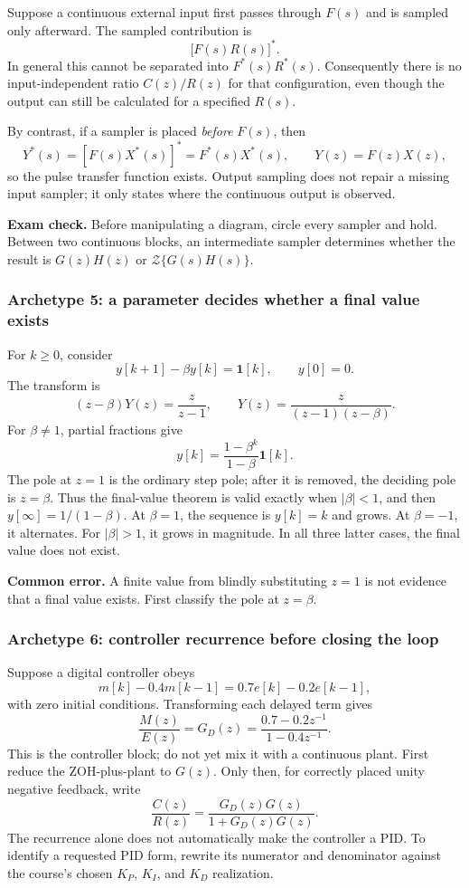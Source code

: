 \documentclass[11pt]{article}
\newcommand{\Z}{\mathcal{Z}}
\newcommand{\unitstep}{\mathbf{1}}
\newcommand{\commonerror}[1]{\par\smallskip\noindent\colorbox{red!8}{\parbox{\dimexpr\linewidth-2\fboxsep\relax}{\textbf{Common error.} #1}}\par\smallskip}
\newcommand{\examcheck}[1]{\par\smallskip\noindent\colorbox{blue!7}{\parbox{\dimexpr\linewidth-2\fboxsep\relax}{\textbf{Exam check.} #1}}\par\smallskip}
\begin{document}
Suppose a continuous external input first passes through $F(s)$ and is sampled only afterward.  The sampled contribution is
\[
\bigl[F(s)R(s)\bigr]^*.
\]
In general this cannot be separated into $F^*(s)R^*(s)$.  Consequently there is no input-independent ratio $C(z)/R(z)$ for that configuration, even though the output can still be calculated for a specified $R(s)$.

By contrast, if a sampler is placed \emph{before} $F(s)$, then
\[
Y^*(s)=[F(s)X^*(s)]^*=F^*(s)X^*(s),
\qquad Y(z)=F(z)X(z),
\]
so the pulse transfer function exists.  Output sampling does not repair a missing input sampler; it only states where the continuous output is observed.

\examcheck{Before manipulating a diagram, circle every sampler and hold.  Between two continuous blocks, an intermediate sampler determines whether the result is $G(z)H(z)$ or $\Z\{G(s)H(s)\}$.}

\subsubsection*{Archetype 5: a parameter decides whether a final value exists}

For $k\geq0$, consider
\[
y[k+1]-\beta y[k]=\unitstep[k],\qquad y[0]=0.
\]
The transform is
\[
(z-\beta)Y(z)=\frac{z}{z-1},
\qquad
Y(z)=\frac{z}{(z-1)(z-\beta)}.
\]
For $\beta\ne1$, partial fractions give
\[
y[k]=\frac{1-\beta^k}{1-\beta}\unitstep[k].
\]
The pole at $z=1$ is the ordinary step pole; after it is removed, the deciding pole is $z=\beta$.  Thus the final-value theorem is valid exactly when $|\beta|<1$, and then $y[\infty]=1/(1-\beta)$.  At $\beta=1$, the sequence is $y[k]=k$ and grows.  At $\beta=-1$, it alternates.  For $|\beta|>1$, it grows in magnitude.  In all three latter cases, the final value does not exist.

\commonerror{A finite value from blindly substituting $z=1$ is not evidence that a final value exists.  First classify the pole at $z=\beta$.}

\subsubsection*{Archetype 6: controller recurrence before closing the loop}

Suppose a digital controller obeys
\[
m[k]-0.4m[k-1]=0.7e[k]-0.2e[k-1],
\]
with zero initial conditions.  Transforming each delayed term gives
\[
\frac{M(z)}{E(z)}=G_D(z)
=\frac{0.7-0.2z^{-1}}{1-0.4z^{-1}}.
\]
This is the controller block; do not yet mix it with a continuous plant.  First reduce the ZOH-plus-plant to $G(z)$.  Only then, for correctly placed unity negative feedback, write
\[
\frac{C(z)}{R(z)}=\frac{G_D(z)G(z)}{1+G_D(z)G(z)}.
\]
The recurrence alone does not automatically make the controller a PID.  To identify a requested PID form, rewrite its numerator and denominator against the course's chosen $K_P$, $K_I$, and $K_D$ realization.
\end{document}
